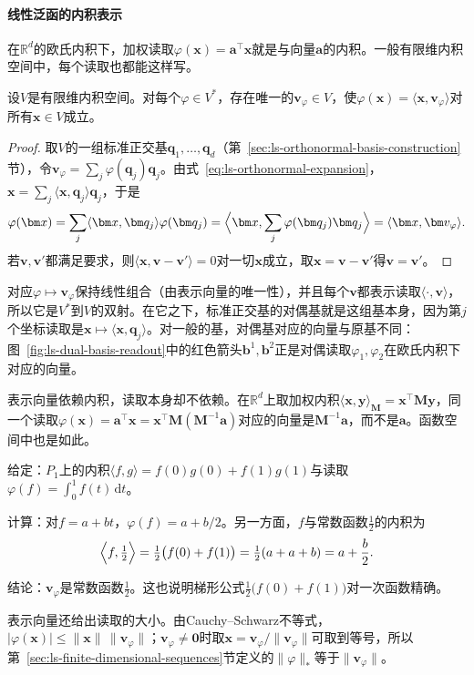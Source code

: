 \paragraph{线性泛函的内积表示}
\label{sec:ls-riesz-representation}
在$\mathbb R^d$的欧氏内积下，加权读取$\varphi(\bm x)=\bm a^\top\bm x$就是与向量$\bm a$的内积。一般有限维内积空间中，每个读取也都能这样写。
\begin{theorem}[有限维Riesz表示定理]
\label{thm:ls-riesz-representation}
设$V$是有限维内积空间。对每个$\varphi\in V^*$，存在唯一的$\bm v_\varphi\in V$，使$\varphi(\bm x)=\langle\bm x,\bm v_\varphi\rangle$对所有$\bm x\in V$成立。
\end{theorem}
\begin{proof}
取$V$的一组标准正交基$\bm q_1,\ldots,\bm q_d$（第~\ref{sec:ls-orthonormal-basis-construction}节），令$\bm v_\varphi=\sum_j\varphi(\bm q_j)\bm q_j$。由式~\eqref{eq:ls-orthonormal-expansion}，$\bm x=\sum_j\langle\bm x,\bm q_j\rangle\bm q_j$，于是
\[
 \varphi(\bm x)=\sum_j\langle\bm x,\bm q_j\rangle\varphi(\bm q_j)=\Bigl\langle\bm x,\sum_j\varphi(\bm q_j)\bm q_j\Bigr\rangle=\langle\bm x,\bm v_\varphi\rangle.
\]
若$\bm v,\bm v'$都满足要求，则$\langle\bm x,\bm v-\bm v'\rangle=0$对一切$\bm x$成立，取$\bm x=\bm v-\bm v'$得$\bm v=\bm v'$。
\end{proof}
对应$\varphi\mapsto\bm v_\varphi$保持线性组合（由表示向量的唯一性），并且每个$\bm v$都表示读取$\langle\cdot,\bm v\rangle$，所以它是$V^*$到$V$的双射。在它之下，标准正交基的对偶基就是这组基本身，因为第$j$个坐标读取是$\bm x\mapsto\langle\bm x,\bm q_j\rangle$。对一般的基，对偶基对应的向量与原基不同：图~\ref{fig:ls-dual-basis-readout}中的红色箭头$\bm b^1,\bm b^2$正是对偶读取$\varphi_1,\varphi_2$在欧氏内积下对应的向量。

表示向量依赖内积，读取本身却不依赖。在$\mathbb R^d$上取加权内积$\langle\bm x,\bm y\rangle_{\bm M}=\bm x^\top\bm M\bm y$，同一个读取$\varphi(\bm x)=\bm a^\top\bm x=\bm x^\top\bm M(\bm M^{-1}\bm a)$对应的向量是$\bm M^{-1}\bm a$，而不是$\bm a$。函数空间中也是如此。
\begin{example}[积分读取在两点内积下的表示向量]
\label{ex:ls-riesz-integral-two-point}
给定：$P_1$上的内积$\langle f,g\rangle=f(0)g(0)+f(1)g(1)$与读取$\varphi(f)=\int_0^1f(t)\,\mathrm dt$。

计算：对$f=a+bt$，$\varphi(f)=a+b/2$。另一方面，$f$与常数函数$\tfrac12$的内积为
\[
 \Bigl\langle f,\tfrac12\Bigr\rangle=\tfrac12\bigl(f(0)+f(1)\bigr)=\tfrac12(a+a+b)=a+\frac b2 .
\]

结论：$\bm v_\varphi$是常数函数$\tfrac12$。这也说明梯形公式$\tfrac12\bigl(f(0)+f(1)\bigr)$对一次函数精确。
\end{example}
表示向量还给出读取的大小。由Cauchy--Schwarz不等式，$|\varphi(\bm x)|\leq\lVert\bm x\rVert\,\lVert\bm v_\varphi\rVert$；$\bm v_\varphi\neq\bm0$时取$\bm x=\bm v_\varphi/\lVert\bm v_\varphi\rVert$可取到等号，所以第~\ref{sec:ls-finite-dimensional-sequences}节定义的$\lVert\varphi\rVert_*$等于$\lVert\bm v_\varphi\rVert$。

